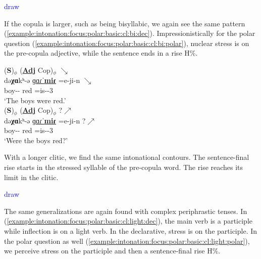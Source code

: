 \textcolor{blue}{draw}

If the copula is larger, such as being bisyllabic, we again see the same pattern (\ref{example:intonation:focus:polar:basic:cl:bi:dec}). Impressionistically for the polar question (\ref{example:intonation:focus:polar:basic:cl:bi:polar}), nuclear stress is on the pre-copula adjective, while the sentence ends in a rise H\%. 


\begin{exe}
	\ex \begin{xlist}
		\ex \glll   (\textbf{S})$_\phi$ (\underline{\textbf{Adj}} Cop)$_\phi$ $\searrow$ \\
		də\textbf{χɑ}kʰ-ə  \underline{ɡɑɾˈ\textbf{miɾ}} =e-ji-n $\searrow$ \\
		boy-{\pl}-{} red =is-{\pst}-3{\pl}   \\
		\trans `The boys were  red.'
		\label{example:intonation:focus:polar:basic:cl:bi:dec}
		\\  
		\ex \glll   (\textbf{S})$_\phi$ (\underline{\textbf{Adj}} Cop)$_\phi$ ?$\nearrow$ \\
		də\textbf{χɑ}kʰ-ə  {\underline{ɡɑɾˈ\textbf{miɾ}}} =e-ji-n  ?$\nearrow$ \\
		boy-{\pl}-{} red   =is-{\pst}-3{\pl} \\ 
		\trans `Were the boys red?'
		\label{example:intonation:focus:polar:basic:cl:bi:polar}
		\\ 
		
	\end{xlist}
\end{exe}

With a longer clitic, we find the same intonational contours. The sentence-final rise starts in the stressed syllable of the pre-copula word. The rise reaches its limit in the clitic. 



\textcolor{blue}{draw}

The same generalizations are again found with complex periphrastic tenses. In (\ref{example:intonation:focus:polar:basic:cl:light:dec}), the main verb is a participle while inflection is on a light verb. In the declarative, stress is on the participle. In the polar question as well (\ref{example:intonation:focus:polar:basic:cl:light:polar}), we perceive stress on the participle  and then a sentence-final rise H\%. 


